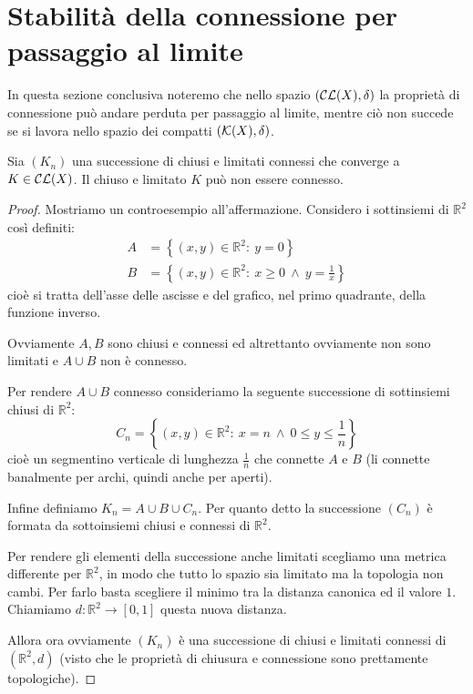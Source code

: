 \section{Stabilità della connessione per passaggio al limite}
In questa sezione conclusiva noteremo che nello spazio $(\mathcal{CL}(X),\delta)$ la proprietà di connessione può andare perduta per passaggio al limite, mentre ciò non succede se si lavora nello spazio dei compatti $(\mathcal{K}(X),\delta)$.

\begin{theorem}
	Sia $(K_n)$ una successione di chiusi e limitati connessi che converge a $K\in\mathcal{CL}(X)$. Il chiuso e limitato $K$ può non essere connesso.
\end{theorem}
\begin{proof}
	Mostriamo un controesempio all'affermazione.
	Considero i sottinsiemi di $\mathbb R^2$ così definiti:
	\begin{align*}
		A&=\left\{(x,y)\in\mathbb R^2:\ y=0\right\}\\
		B&=\left\{(x,y)\in\mathbb R^2:\ x\ge 0\ \wedge\ y=\frac 1x \right\}
	\end{align*}
	cioè si tratta dell'asse delle ascisse e del grafico, nel primo quadrante, della funzione inverso.
	
	Ovviamente $A,B$ sono chiusi e connessi ed altrettanto ovviamente non sono limitati e $A\cup B$ non è connesso.
	
	Per rendere $A\cup B$ connesso consideriamo la seguente successione di sottinsiemi chiusi di $\mathbb R^2$:
	\begin{equation}
		C_n=\left\{(x,y)\in\mathbb R^2:\ x=n\ \wedge\ 0\le y\le \frac 1n\right\}
	\end{equation}
	cioè un segmentino verticale di lunghezza $\frac 1n$ che connette $A$ e $B$ (li connette banalmente per archi, quindi anche per aperti).
	
	Infine definiamo $K_n=A\cup B\cup C_n$. Per quanto detto la successione $(C_n)$ è formata da sottoinsiemi chiusi e connessi di $\mathbb R^2$.
	
	Per rendere gli elementi della successione anche limitati scegliamo una metrica differente per $\mathbb R^2$, in modo che tutto lo spazio sia limitato ma la topologia non cambi. Per farlo basta scegliere il minimo tra la distanza canonica ed il valore $1$. Chiamiamo $d:\mathbb R^2\to [0,1]$ questa nuova distanza.
	
	Allora ora ovviamente $(K_n)$ è una successione di chiusi e limitati connessi di $(\mathbb R^2, d)$ (visto che le proprietà di chiusura e connessione sono prettamente topologiche).
	

\end{proof}
